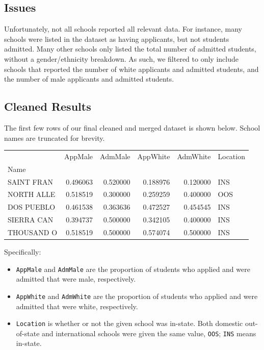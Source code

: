 \documentclass{article}
\begin{document}
\subsection{Issues}
Unfortunately, not all schools reported all relevant data. For instance, many schools were listed in the dataset as having applicants, but not students admitted. Many other schools only listed the total number of admitted students, without a gender/ethnicity breakdown. As such, we filtered \texttt{\gender} to only include schools that reported the number of white applicants and admitted students, and the number of male applicants and admitted students.

\subsection{Cleaned Results}
The first few rows of our final cleaned and merged dataset is shown below. School names are truncated for brevity.

\begin{tabular}{lrrrrl}
\toprule
{} &   AppMale &   AdmMale &  AppWhite &  AdmWhite & Location \\
Name       &           &           &           &           &          \\
\midrule
SAINT FRAN &  0.496063 &  0.520000 &  0.188976 &  0.120000 &      INS \\
NORTH ALLE &  0.518519 &  0.300000 &  0.259259 &  0.400000 &      OOS \\
DOS PUEBLO &  0.461538 &  0.363636 &  0.472527 &  0.454545 &      INS \\
SIERRA CAN &  0.394737 &  0.500000 &  0.342105 &  0.400000 &      INS \\
THOUSAND O &  0.518519 &  0.500000 &  0.574074 &  0.500000 &      INS \\
\bottomrule
\end{tabular}

Specifically:
\begin{itemize}
    \item \texttt{AppMale} and \texttt{AdmMale} are the proportion of students who applied and were admitted that were male, respectively.
    \item \texttt{AppWhite} and \texttt{AdmWhite} are the proportion of students who applied and were admitted that were white, respectively.
    \item \texttt{Location} is whether or not the given school was in-state. Both domestic out-of-state and international schools were given the same value, \texttt{OOS}; \texttt{INS} means in-state.
\end{itemize}
\end{document}
